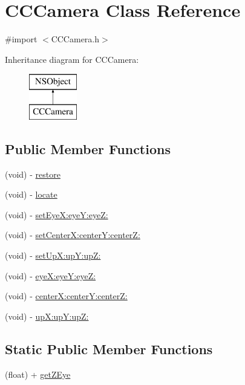 \hypertarget{interface_c_c_camera}{\section{C\-C\-Camera Class Reference}
\label{interface_c_c_camera}
}


{\ttfamily \#import $<$C\-C\-Camera.\-h$>$}

Inheritance diagram for C\-C\-Camera\-:\begin{figure}[H]
\begin{center}
\leavevmode
\includegraphics[height=2.000000cm]{interface_c_c_camera}
\end{center}
\end{figure}
\subsection*{Public Member Functions}
\begin{DoxyCompactItemize}
\item 
(void) -\/ \hyperlink{interface_c_c_camera_abd65553333481d2463d5d6be2f550445}{restore}
\item 
(void) -\/ \hyperlink{interface_c_c_camera_a5b42131251688d0a990821019ed2a339}{locate}
\item 
(void) -\/ \hyperlink{interface_c_c_camera_ad2cdf939a611a3831d0e9e5bc5f23ec7}{set\-Eye\-X\-:eye\-Y\-:eye\-Z\-:}
\item 
(void) -\/ \hyperlink{interface_c_c_camera_a382432599e907c5c3e8f5c5f91169387}{set\-Center\-X\-:center\-Y\-:center\-Z\-:}
\item 
(void) -\/ \hyperlink{interface_c_c_camera_acb6c6175765ba500f7d596bfc7382357}{set\-Up\-X\-:up\-Y\-:up\-Z\-:}
\item 
(void) -\/ \hyperlink{interface_c_c_camera_afd57f0641e3f4224c0e5ec68ae0d664a}{eye\-X\-:eye\-Y\-:eye\-Z\-:}
\item 
(void) -\/ \hyperlink{interface_c_c_camera_a46f9478718fb45c68aeedcb170055291}{center\-X\-:center\-Y\-:center\-Z\-:}
\item 
(void) -\/ \hyperlink{interface_c_c_camera_a8c5a3413b304f241dad48c224b74190d}{up\-X\-:up\-Y\-:up\-Z\-:}
\end{DoxyCompactItemize}
\subsection*{Static Public Member Functions}
\begin{DoxyCompactItemize}
\item 
(float) + \hyperlink{interface_c_c_camera_a74f0f52f055e36fee0708dbb25c38835}{get\-Z\-Eye}
\end{DoxyCompactItemize}
